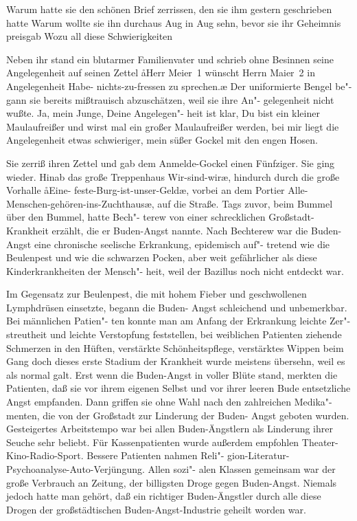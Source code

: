 Warum hatte sie den schönen Brief zerrissen, den sie ihm
gestern geschrieben hatte\frag{} Warum wollte sie ihn durchaus
Aug in Aug sehn, bevor sie ihr Geheimnis preisgab\frag{} Wozu
all diese Schwierigkeiten\frag{}

Neben ihr stand ein blutarmer Familienvater und schrieb
ohne Besinnen seine Angelegenheit auf seinen Zettel\dopp{} \aa{}Herr
Meier~1 wünscht Herrn Maier~2 in Angelegenheit Habe-%
nichts-zu-fressen zu sprechen.\ae{} Der uniformierte Bengel be"-%
gann sie bereits mißtrauisch abzuschätzen, weil sie ihre An"-%
gelegenheit nicht wußte. Ja, mein Junge, Deine Angelegen"-%
heit ist klar, Du bist ein kleiner Maulaufreißer und wirst
mal ein großer Maulaufreißer werden, bei mir liegt die
Angelegenheit etwas schwieriger, mein süßer Gockel mit den
engen Hosen.

Sie zerriß ihren Zettel und gab dem Anmelde-Gockel einen
Fünfziger. Sie ging wieder. Hinab das große Treppenhaus
\aanah{}Wir-sind-wir\ae{}, hindurch durch die große Vorhalle \aa{}Eine-%
feste-Burg-ist-unser-Geld\ae{}, vorbei an dem Portier \aanah{}Alle-%
Menschen-gehören-ins-Zuchthaus\ae{}, auf die Straße.
\abstand{}
Tags zuvor, beim Bummel über den Bummel, hatte Bech"-%
terew von einer schrecklichen Großstadt-Krankheit erzählt, die
er Buden-Angst nannte. Nach Bechterew war die Buden-%
Angst eine chronische seelische Erkrankung, epidemisch auf"-%
tretend wie die Beulenpest und wie die schwarzen Pocken,
aber weit gefährlicher als diese Kinderkrankheiten der Mensch"-%
heit, weil der Bazillus noch nicht entdeckt war.

Im Gegensatz zur Beulenpest, die mit hohem Fieber und
geschwollenen Lymphdrüsen einsetzte, begann die Buden-%
Angst schleichend und unbemerkbar. Bei männlichen Patien"-%
ten konnte man am Anfang der Erkrankung leichte Zer"-%
streutheit und leichte Verstopfung feststellen, bei weiblichen
Patienten ziehende Schmerzen in den Hüften, verstärkte
Schönheitspflege, verstärktes Wippen beim Gang\dopp{} doch dieses
erste Stadium der Krankheit wurde meistens übersehn, weil
es als normal galt. Erst wenn die Buden-Angst in voller
Blüte stand, merkten die Patienten, daß sie vor ihrem eigenen
Selbst und vor ihrer leeren Bude entsetzliche Angst empfanden.
Dann griffen sie ohne Wahl nach den zahlreichen Medika"-%
menten, die von der Großstadt zur Linderung der Buden-%
Angst geboten wurden. Gesteigertes Arbeitstempo war bei
allen Buden-Ängstlern als Linderung ihrer Seuche sehr
beliebt. Für Kassenpatienten wurde außerdem empfohlen
Theater-Kino-Radio-Sport. Bessere Patienten nahmen Reli"-%
gion-Literatur-Psychoanalyse-Auto-Verjüngung. Allen sozi"-%
alen Klassen gemeinsam war der große Verbrauch an Zeitung,
der billigsten Droge gegen Buden-Angst. Niemals jedoch hatte
man gehört, daß ein richtiger Buden-Ängstler durch alle diese
Drogen der großstädtischen Buden-Angst-Industrie geheilt
worden war.

